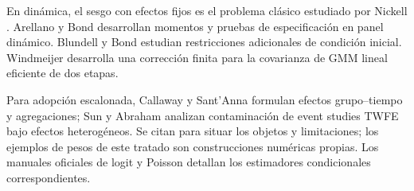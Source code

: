 \documentclass[11pt,a4paper]{article}
\theoremstyle{definition}
\newcounter{problema}
\begin{document}
En dinámica, el sesgo con efectos fijos es el problema clásico estudiado por Nickell \cite{nickell}. Arellano y Bond \cite{ab} desarrollan momentos y pruebas de especificación en panel dinámico. Blundell y Bond \cite{bb} estudian restricciones adicionales de condición inicial. Windmeijer \cite{windmeijer} desarrolla una corrección finita para la covarianza de GMM lineal eficiente de dos etapas.

Para adopción escalonada, Callaway y Sant'Anna \cite{cs} formulan efectos grupo--tiempo y agregaciones; Sun y Abraham \cite{sa} analizan contaminación de event studies TWFE bajo efectos heterogéneos. Se citan para situar los objetos y limitaciones; los ejemplos de pesos de este tratado son construcciones numéricas propias. Los manuales oficiales de logit y Poisson \cite{logit,poisson} detallan los estimadores condicionales correspondientes.
\end{document}

